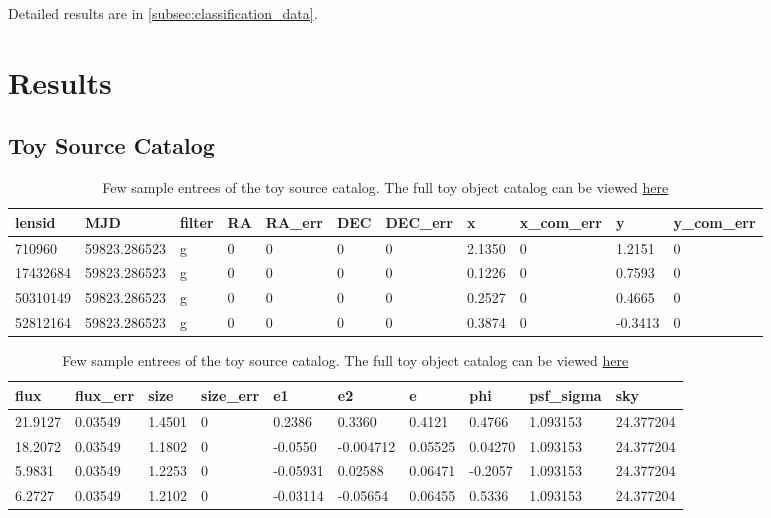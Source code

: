 \documentclass[\docopts]{\docclass}
\begin{document}
Detailed results are in \ref{subsec:classification_data}.


\section{Results}
\label{sec:results}

\subsection{Toy Source Catalog}
\label{subsec:toysource}

\begin{table}[!h]
\centering
\begin{tabular}{|l|l|l|l|l|l|l|l|l|l|l|}
\hline
lensid   & MJD          & filter & RA & RA\_err & DEC & DEC\_err & x              & x\_com\_err & y               & y\_com\_err \\ \hline 
710960   & 59823.286523 & g      & 0  & 0       & 0   & 0        & 2.1350  & 0           & 1.2151 & 0			\\
17432684 & 59823.286523 & g      & 0  & 0       & 0   & 0        & 0.1226 & 0           & 0.7593  & 0           \\
50310149 & 59823.286523 & g      & 0  & 0       & 0   & 0        & 0.2527 & 0           & 0.4665  & 0           \\
52812164 & 59823.286523 & g      & 0  & 0       & 0   & 0        & 0.3874 & 0           & -0.3413 & 0          \\ \hline
\end{tabular}
\begin{tabular}{|l|l|l|l|l|l|l|l|l|l|}
\hline
flux          & flux\_err       & size          & size\_err & e1               & e2                & e               & phi             & psf\_sigma & sky       \\ \hline
21.9127 & 0.03549 & 1.4501 & 0         & 0.2386    & 0.3360    & 0.4121  & 0.4766  & 1.093153   & 24.377204 \\
18.2072 & 0.03549& 1.1802  & 0         & -0.0550 & -0.004712  & 0.05525 & 0.04270 & 1.093153   & 24.377204 \\
5.9831 & 0.03549 & 1.2253 & 0         & -0.05931 & 0.02588     & 0.06471 & -0.2057 & 1.093153   & 24.377204 \\
6.2727 & 0.03549 & 1.2102  & 0         & -0.03114 & -0.05654  & 0.06455 & 0.5336  & 1.093153   & 24.377204 \\ \hline
\end{tabular}
\caption{Few sample entrees of the toy source catalog. The full toy object catalog can be viewed \href{https://www.dropbox.com/s/muqui8eu3kxox2l/toy_source_catalog.csv?dl=0}{here}}
\label{table:source_table}
\end{table}
\end{document}
